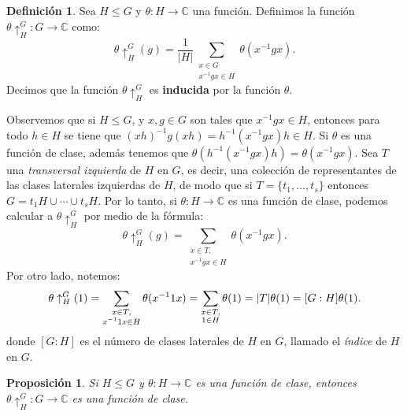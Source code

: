 \documentclass[12pt]{book}
\newtheorem{proposition}[theorem]{Proposición}
\theoremstyle{definition}
\newtheorem{definition}[theorem]{Definición}
\newcounter{in}
\newcounter{ini}
\begin{document}
\begin{definition}
  Sea $H\leq G$ y $\theta:H\rightarrow \mathbb{C}$ una función. Definimos la
  función $\theta\uparrow^{G}_{H}:G\rightarrow \mathbb{C}$ como:
  \begin{equation*}
    \theta\uparrow^{G}_{H}(g)=\frac{1}{|H|}\sum_{\substack{x\in
        G\\x^{-1}gx\in H}}\theta(x^{-1}gx).
  \end{equation*}
  Decimos que la función $\theta\uparrow^{G}_{H}$ es \textbf{inducida}
  por la función $\theta$.
\end{definition}
Observemos que si $H\leq G$, y $x,g\in G$ son tales que $x^{-1}gx\in
H$, entonces para todo $h\in H$ se tiene que
$(xh)^{-1}g(xh)=h^{-1}(x^{-1}gx)h\in H$. Si $\theta$ es una función de
clase, además tenemos que
$\theta(h^{-1}(x^{-1}gx)h)=\theta(x^{-1}gx)$. Sea $T$ una \emph{transversal izquierda} de $H$ en $G$, es decir, una
colección de representantes de las clases laterales izquierdas de $H$,
de modo que si $T=\{t_{1},\ldots,t_{s}\}$ entonces
$G=t_{1}H\cup\cdots\cup t_{s}H$. Por lo tanto, si
$\theta:H\rightarrow\mathbb{C}$ es una función de clase, podemos
calcular a $\theta\uparrow^{G}_{H}$ por medio de la fórmula:
\begin{equation}
  \label{fun-ind-trans}
  \theta\uparrow^{G}_{H}(g)=\sum_{\substack{x\in T,\\x^{-1}gx\in H}}\theta(x^{-1}gx).
\end{equation}
Por otro lado, notemos:
\begin{equation*}
  \theta\uparrow^{G}_{H}(1)=\sum_{\substack{x\in T,\\x^{-1}1x\in
      H}}\theta(x^{-1}1x)=\sum_{\substack{x\in T,\\1\in
      H}}\theta(1)=|T|\theta(1)=[G:H]\theta(1).\\
\end{equation*}
donde $[G:H]$ es el número de clases laterales de $H$ en $G$, llamado
el \emph{índice} de $H$ en $G$.
\begin{proposition}
  Si $H\leq G$ y $\theta:H\rightarrow \mathbb{C}$ es una función de
  clase, entonces $\theta\uparrow^{G}_{H}:G\rightarrow \mathbb{C}$ es
  una función de clase. 
\end{proposition}
\end{document}
